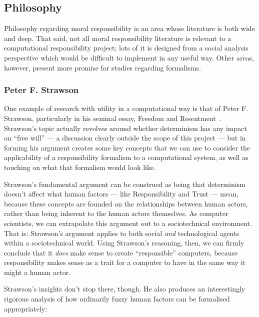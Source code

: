 \subsection{Philosophy}\label{subsec:philosophy}
Philosophy regarding moral responsibility is an area whose literature is both wide and deep. That said, not all moral responsibility literature is relevant to a computational responsibility project; lots of it is designed from a social analysis perspective which would be difficult to implement in any useful way. Other areas, however, present more promise for studies regarding formalisms.\par

\subsubsection{Peter F. Strawson}\label{sec:strawson}
One example of research with utility in a computational way is that of Peter F. Strawson, particularly in his seminal essay, Freedom and Resentment~\cite{strawson}. Strawson's topic actually revolves around whether determinism has any impact on ``free will'' --- a discussion clearly outside the scope of this project --- but in forming his argument creates some key concepts that we can use to consider the applicability of a responsibility formalism to a computational system, as well as touching on what that formalism would look like.\par

Strawson's fundamental argument can be construed as being that determinism doesn't affect what human factors --- like Responsibility and Trust --- mean, because these concepts are founded on the relationships between human actors, rather than being inherent to the human actors themselves. As computer scientists, we can extrapolate this argument out to a sociotechnical environment. That is: Strawson's argument applies to both social \emph{and} technological agents within a sociotechnical world. Using Strawson's reasoning, then, we can firmly conclude that it \emph{does} make sense to create ``responsible'' computers, because responsibility makes sense as a trait for a computer to have in the same way it might a human actor.\par

Strawson's insights don't stop there, though. He also produces an interestingly rigorous analysis of how ordinarily fuzzy human factors can be formalised appropriately:

